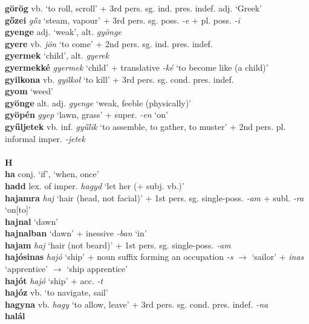 \documentclass[11pt]{article}
\begin{document}
\textbf{görög} vb. `to roll, scroll' + 3rd
pers. sg. ind. pres. indef. \textbar\textbar{} adj. `Greek' \\
\textbf{gőzei} \emph{gőz} `steam, vapour' + 3rd
pers. sg. poss. \emph{-e} + pl. poss. \emph{-i} \\
\textbf{gyenge} adj. `weak', alt. \emph{gyönge} \\
\textbf{gyere} vb. \emph{jön} `to come' + 2nd
pers. sg. ind. pres. indef. \\
\textbf{gyermek} `child', alt. \emph{gyerek} \\
\textbf{gyermekké} \emph{gyermek} `child' + translative \emph{-ké}
`to become like (a child)' \\
\textbf{gyilkona} vb. \emph{gyilkol} `to kill' + 3rd
pers. sg. cond. pres. indef. \\
\textbf{gyom} `weed' \\
\textbf{gyönge} alt. adj. \emph{gyenge} `weak, feeble (physically)' \\
\textbf{gyöpén} \emph{gyep} `lawn, grass' + super. \emph{-en} `on' \\
\textbf{gyűljetek} vb. inf. \emph{gyűlik} `to assemble, to gather, to muster' + 2nd
pers. pl. informal imper. \emph{-jetek} \\
\ \\
\noindent \textbf{\large H} \\ \textbf{ha} conj. `if', `when, once'
\\ \textbf{hadd} lex. of imper. \emph{hagyd} `let her (+ subj. vb.)'
\\ \textbf{hajamra} \emph{haj} `hair (head, not facial)' + 1st
pers. sg. single\hyp{}poss. \emph{-am} + subl. \emph{-ra} `on[to]'
\\ \textbf{hajnal} `dawn' \\ \textbf{hajnalban} `dawn' +
inessive \emph{-ban} `in' \\ \textbf{hajam} \emph{haj} `hair (not
beard)' + 1st pers. sg. single\hyp{}poss. \emph{-am}
\\ \textbf{hajósinas} \emph{hajó} `ship' + noun suffix forming an
occupation \emph{-s} $\rightarrow$ `sailor' + \emph{inas} `apprentice'
$\rightarrow$ `ship apprentice' \\ \textbf{hajót} \emph{hajó} `ship' +
acc. \emph{-t} \\ \textbf{hajóz} vb. `to navigate, sail'
\\ \textbf{hagyna} vb. \emph{hagy} `to allow, leave' + 3rd
pers. sg. cond. pres. indef. \emph{-na} \\ \textbf{halál}
\end{document}
